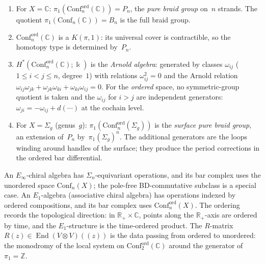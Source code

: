 \begin{proposition}
\label{prop:ordered-config-topology}
\begin{enumerate}[label=\textup{(\roman*)}]
\item For $X=\mathbb C$:
 $\pi_1(\mathrm{Conf}_n^{\mathrm{ord}}(\mathbb C))
 =P_n$, the \emph{pure braid group} on~$n$ strands.
 The quotient
 $\pi_1(\mathrm{Conf}_n(\mathbb C))=B_n$
 is the full braid group.
\item $\mathrm{Conf}_n^{\mathrm{ord}}(\mathbb C)$ is a
 $K(\pi,1)$: its universal cover is contractible, so the
 homotopy type is determined by~$P_n$.
\item $H^*(\mathrm{Conf}_n^{\mathrm{ord}}(\mathbb C);\Bbbk)$
 is the \emph{Arnold algebra}: generated by classes
 $\omega_{ij}$ ($1\le i<j\le n$, degree~$1$) with relations
 $\omega_{ij}^2=0$ and the Arnold relation
 $\omega_{ij}\omega_{jk}+\omega_{jk}\omega_{ki}
 +\omega_{ki}\omega_{ij}=0$.
 For the \emph{ordered} space, no symmetric-group quotient
 is taken and the $\omega_{ij}$ for $i>j$ are independent
 generators: $\omega_{ji}=-\omega_{ij}+d(\cdots)$ at the
 cochain level.
\item For $X=\Sigma_g$ (genus~$g$):
 $\pi_1(\mathrm{Conf}_n^{\mathrm{ord}}(\Sigma_g))$
 is the \emph{surface pure braid group}, an extension
 of~$P_n$ by~$\pi_1(\Sigma_g)^n$. The additional
 generators are the loops winding around handles of the
 surface; they produce the period corrections in the
 ordered bar differential.
\end{enumerate}
\end{proposition}

\begin{remark}
\label{rem:why-ordered}
An $E_\infty$-chiral algebra has $\Sigma_n$-equivariant operations,
and its bar complex uses the unordered space $\mathrm{Conf}_n(X)$;
the pole-free BD-commutative subclass is a special case. An
$E_1$-algebra (associative chiral algebra) has operations indexed
by ordered compositions, and its bar complex uses
$\mathrm{Conf}_n^{\mathrm{ord}}(X)$. The ordering records the
topological direction: in $\mathbb R_+\times\mathbb C$, points
along the $\mathbb R_+$-axis are ordered by time, and the
$E_1$-structure is the time-ordered product. The $R$-matrix
$R(z)\in\operatorname{End}(V\otimes V)(\!(z)\!)$ is the data
passing from ordered to unordered: the monodromy of the local
system on $\mathrm{Conf}_2^{\mathrm{ord}}(\mathbb C)$ around the
generator of $\pi_1=\mathbb Z$.
\end{remark}


